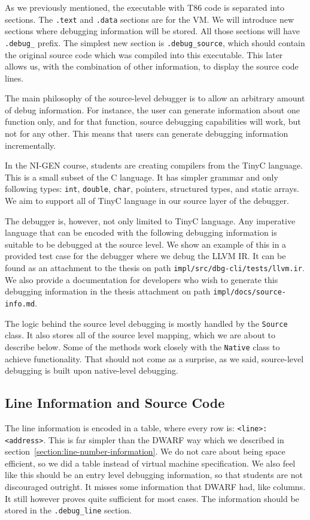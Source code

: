 As we previously mentioned, the executable with T86 code is separated into
sections. The \texttt{.text} and \texttt{.data} sections are for the VM. We
will introduce new sections where debugging information will be stored. All
those sections will have \verb|.debug_| prefix. The simplest new section is
\verb|.debug_source|, which should contain the original source code which was
compiled into this executable. This later allows us, with the combination of
other information, to display the source code lines.

The main philosophy of the source-level debugger is to allow an arbitrary
amount of debug information. For instance, the user can generate information
about one function only, and for that function, source debugging capabilities
will work, but not for any other. This means that users can generate debugging
information incrementally.

In the NI-GEN course, students are creating compilers from the TinyC language.
This is a small subset of the C language. It has simpler grammar and only
following types: \texttt{int}, \texttt{double}, \texttt{char}, pointers,
structured types, and static arrays. We aim to support all of TinyC language in
our source layer of the debugger.

The debugger is, however, not only limited to TinyC language. Any imperative
language that can be encoded with the following debugging information is
suitable to be debugged at the source level. We show an example of this in a
provided test case for the debugger where we debug the LLVM IR. It can be found
as an attachment to the thesis on path \texttt{impl/src/dbg-cli/tests/llvm.ir}.
We also provide a documentation for developers who wish to generate this
debugging information in the thesis attachment on path
\texttt{impl/docs/source-info.md}.

The logic behind the source level debugging is mostly handled by the
\texttt{Source} class. It also stores all of the source level mapping, which we
are about to describe below. Some of the methods work closely with the
\texttt{Native} class to achieve functionality. That should not come as a
surprise, as we said, source-level debugging is built upon native-level
debugging.

\subsection{Line Information and Source Code}
The line information is encoded in a table, where every row is:
\texttt{<line>:<address>}. This is far simpler than the DWARF way which we
described in section~\ref{section:line-number-information}. We do not care
about being space efficient, so we did a table instead of virtual machine
specification. We also feel like this should be an entry level debugging
information, so that students are not discouraged outright. It misses some
information that DWARF had, like columns. It still however proves quite
sufficient for most cases. The information should be stored in the
\verb|.debug_line| section.

